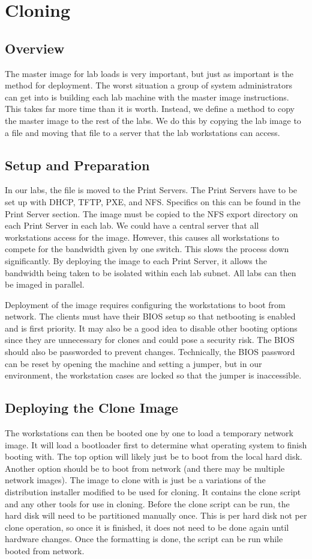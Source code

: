 \section{Cloning} \label{sec:cloning}
\subsection{Overview}
The master image for lab loads is very important, but just as important is the method for deployment.  The worst situation a group of system administrators can get into is building each lab machine with the master image instructions.  This takes far more time than it is worth.  Instead, we define a method to copy the master image to the rest of the labs.  We do this by copying the lab image to a file and moving that file to a server that the lab workstations can access.  
\subsection{Setup and Preparation}
In our labs, the file is moved to the Print Servers.  The Print Servers have to be set up with DHCP, TFTP, PXE, and NFS.  Specifics on this can be found in the Print Server section.  The image must be copied to the NFS export directory on each Print Server in each lab.  We could have a central server that all workstations access for the image.  However, this causes all workstations to compete for the bandwidth given by one switch.  This slows the process down significantly.  By deploying the image to each Print Server, it allows the bandwidth being taken to be isolated within each lab subnet.  All labs can then be imaged in parallel.  

Deployment of the image requires configuring the workstations to boot from network.  The clients must have their BIOS setup so that netbooting is enabled and is first priority.  It may also be a good idea to disable other booting options since they are unnecessary for clones and could pose a security risk.  The BIOS should also be passworded to prevent changes.  Technically, the BIOS password can be reset by opening the machine and setting a jumper, but in our environment, the workstation cases are locked so that the jumper is inaccessible.  
\subsection{Deploying the Clone Image}
The workstations can then be booted one by one to load a temporary network image.  It will load a bootloader first to determine what operating system to finish booting with.  The top option will likely just be to boot from the local hard disk.  Another option should be to boot from network (and there may be multiple network images).  The image to clone with is just be a variations of the distribution installer modified to be used for cloning.  It contains the clone script and any other tools for use in cloning.  Before the clone script can be run, the hard disk will need to be partitioned manually once.  This is per hard disk not per clone operation, so once it is finished, it does not need to be done again until hardware changes.  Once the formatting is done, the script can be run while booted from network.

